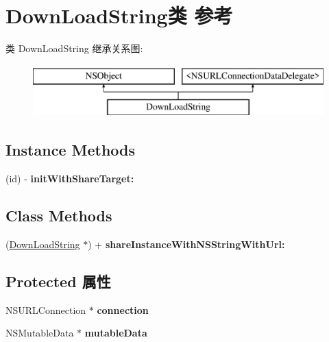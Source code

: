 \hypertarget{interface_down_load_string}{\section{Down\-Load\-String类 参考}
\label{interface_down_load_string}
}
类 Down\-Load\-String 继承关系图\-:\begin{figure}[H]
\begin{center}
\leavevmode
\includegraphics[height=2.000000cm]{interface_down_load_string}
\end{center}
\end{figure}
\subsection*{Instance Methods}
\begin{DoxyCompactItemize}
\item 
\hypertarget{interface_down_load_string_ada64a31dab7af544b5117f699affdb19}{(id) -\/ {\bfseries init\-With\-Share\-Target\-:}}\label{interface_down_load_string_ada64a31dab7af544b5117f699affdb19}

\end{DoxyCompactItemize}
\subsection*{Class Methods}
\begin{DoxyCompactItemize}
\item 
\hypertarget{interface_down_load_string_a6aa18ac8e65c63e85454ce11104efc17}{(\hyperlink{interface_down_load_string}{Down\-Load\-String} $\ast$) + {\bfseries share\-Instance\-With\-N\-S\-String\-With\-Url\-:}}\label{interface_down_load_string_a6aa18ac8e65c63e85454ce11104efc17}

\end{DoxyCompactItemize}
\subsection*{Protected 属性}
\begin{DoxyCompactItemize}
\item 
\hypertarget{interface_down_load_string_aa07deaf3096e63547098b66ad0d2e366}{N\-S\-U\-R\-L\-Connection $\ast$ {\bfseries connection}}\label{interface_down_load_string_aa07deaf3096e63547098b66ad0d2e366}

\item 
\hypertarget{interface_down_load_string_a614b5dfd4e05104a7cfda37751399efb}{N\-S\-Mutable\-Data $\ast$ {\bfseries mutable\-Data}}\label{interface_down_load_string_a614b5dfd4e05104a7cfda37751399efb}

\end{DoxyCompactItemize}
